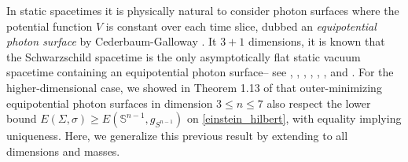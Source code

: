 \documentclass[12pt,twoside]{article}
\theoremstyle{plain}
\newtheorem{theorem}{Theorem}[section]
\theoremstyle{definition}
\theoremstyle{remark}
\numberwithin{equation}{section}
\begin{document}
In static spacetimes it is physically natural to consider photon surfaces where the potential function $V$ is constant over each time slice, dubbed an \textit{equipotential photon surface} by Cederbaum-Galloway \cite{CG}. It $3+1$ dimensions, it is known that the Schwarzschild spacetime is the only asymptotically flat static vacuum spacetime containing an equipotential photon surface-- see \cite{Cederbaum}, \cite{BCC24}, \cite{Rau}, \cite{photon_sphere_positive_mass}, \cite{geometry_photon_surfaces},  \cite{CG}, and \cite{CCF24}. For the higher-dimensional case, we showed in Theorem 1.13 of \cite{HW} that outer-minimizing equipotential photon surfaces in dimension $3 \leq n \leq 7$ also respect the lower bound $E(\Sigma,\sigma) \geq E(\mathbb{S}^{n-1},g_{S^{n-1}})$ on \eqref{einstein_hilbert}, with equality implying uniqueness. Here, we generalize this previous result by extending to all dimensions and masses.




\end{document}
